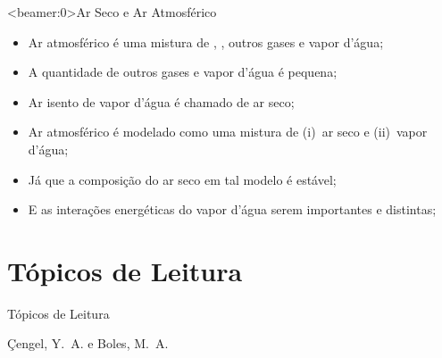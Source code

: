     {
    \begin{frame}<beamer:0>{Ar Seco e Ar Atmosférico}\vspace*{-2em}
        \begin{itemize}
            \item<1-> \alert{Ar atmosférico} é uma mistura de , , outros gases e
                \alert{vapor d'água};
            \item<2-> A quantidade de outros gases e vapor d'água é pequena;
            \item<3-> Ar \alert{isento} de vapor d'água é chamado de \alert{ar seco};
            \item<4-> Ar atmosférico é modelado como uma mistura de (i)~\alert{ar seco} e
                (ii)~\alert{vapor d'água};
            \item<5-> Já que a composição do ar seco em tal modelo é estável;
            \item<6-> E as interações \alert{energéticas} do \alert{vapor d'água} serem
                \alert{importantes} e \alert{distintas};
        \end{itemize}
    \end{frame}}

\section{Tópicos de Leitura}

    \begin{frame}[allowframebreaks]{Tópicos de Leitura}
        \begin{thebibliography}{Çengel, Y.~A., 2013}
                Çengel, Y.~A. e Boles, M.~A.
        \end{thebibliography}
    \end{frame}




